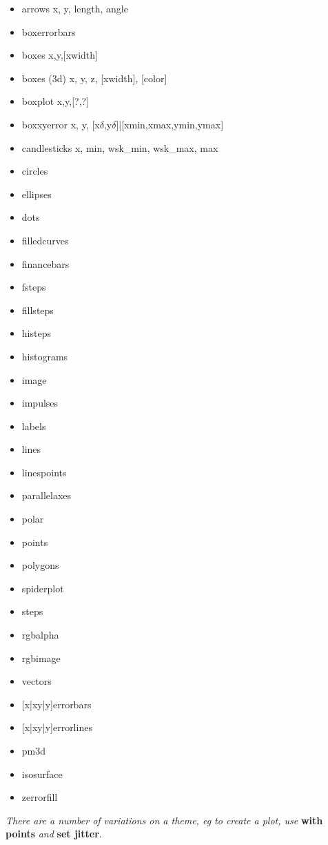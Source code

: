 {\footnotesize
\begin{itemize}
    \item arrows \quad x, y, length, angle
    \item boxerrorbars \quad 
    \item boxes \quad x,y,[xwidth]
    \item boxes (3d) \quad x, y, z, [xwidth], [color]
    \item boxplot \quad x,y,[?,?]
    \item boxxyerror \quad x, y, [x$\delta$,y$\delta$]|[xmin,xmax,ymin,ymax]
    \item candlesticks \quad x, min, wsk\_min, wsk\_max, max
    \item circles
    \item ellipses
    \item dots
    \item filledcurves
    \item financebars
    \item fsteps
    \item fillsteps
    \item histeps
    \item histograms
    \item image
    \item impulses
    \item labels
    \item lines
    \item linespoints
    \item parallelaxes
    \item polar 
    \item points
    \item polygons
    \item spiderplot
    \item steps
    \item rgbalpha
    \item rgbimage
    \item vectors
    \item {[x|xy|y]}errorbars
    \item {[x|xy|y]}errorlines
    \item pm3d
    \item isosurface
    \item zerrorfill
\end{itemize}}

\textit{There are a number of variations on a theme, eg to create a  plot, use }\textbf{with points}\textit{ and }\textbf{set jitter}.

